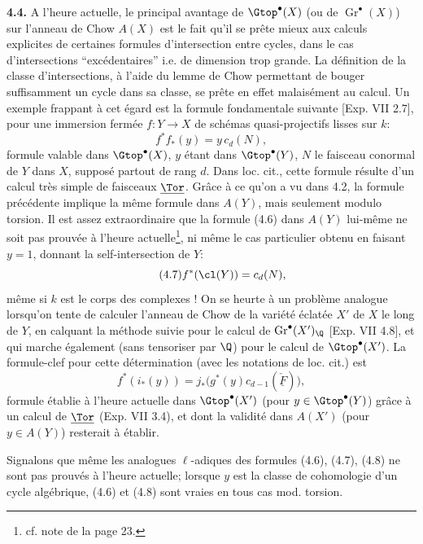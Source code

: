 \textbf{4.4.} A l'heure actuelle, le principal avantage de $\Gtop^\bullet(X)$ (ou de $\operatorname{Gr}^\bullet(X)$) sur l'anneau de Chow $A(X)$ est le fait qu'il se prête mieux aux calculs explicites de certaines formules d'intersection entre cycles, dans le cas d'intersections ``excédentaires'' i.e. de dimension trop grande. La définition de la classe d'intersections, à l'aide du lemme de Chow permettant de bouger suffisamment un cycle dans sa classe, se prête en effet malaisément au calcul. Un exemple frappant à cet égard est la formule fondamentale suivante [Exp. VII 2.7], pour une immersion fermée $f:Y\to X$ de schémas quasi-projectifs lisses sur $k$:
\begin{equation}\tag{4.6}
 f^*f_*(y)=y\,c_d(N),
\end{equation}
formule valable dans $\Gtop^\bullet(X)$, $y$ étant dans $\Gtop^\bullet(Y)$, $N$ le faisceau conormal de $Y$
dans $X$, supposé partout de rang $d$. Dans loc. cit., cette formule résulte d'un calcul très simple de faisceaux $\underline{\Tor}$. Grâce à ce qu'on a vu dans 4.2, la formule précédente implique la même formule dans $A(Y)$, mais seulement modulo torsion. Il est assez extraordinaire que la formule (4.6) dans $A(Y)$ lui-même ne soit pas prouvée à l'heure actuelle\footnote{cf. note de la page 23.}, ni même le cas particulier obtenu en faisant $y=1$, donnant la self-intersection de $Y$:
\begin{equation}\tag{4.7}
 f^*(\cl(Y))=c_d(N),
\end{equation}
même si $k$ est le corps des complexes ! On se heurte à un problème analogue lorsqu'on tente de calculer l'anneau de Chow de la variété éclatée $X'$ de $X$ le long de $Y$, en calquant la méthode suivie pour le calcul de $\operatorname{Gr}^\bullet(X')_\Q$ [Exp. VII 4.8], et qui marche également (sans tensoriser par $\Q$) pour le calcul de $\Gtop^\bullet(X')$. La formule-clef pour cette détermination (avec les notations de loc. cit.) est
\begin{equation}\tag{4.8}
 f^*(i_*(y))=j_*\bigl(g^*(y)c_{d-1}(\check{\underline F})\bigr),
\end{equation}
formule établie à l'heure actuelle dans $\Gtop^\bullet(X')$ (pour $y\in\Gtop^\bullet(Y)$) grâce à un calcul de $\underline{\Tor}$ (Exp. VII 3.4), et dont la validité dans $A(X')$ (pour $y\in A(Y)$) resterait à établir.

Signalons que même les analogues $\ell$-adiques des formules (4.6), (4.7), (4.8) ne sont pas prouvés à l'heure actuelle; lorsque $y$ est la classe de cohomologie d'un cycle algébrique, (4.6) et (4.8) sont vraies en tous cas mod. torsion.


